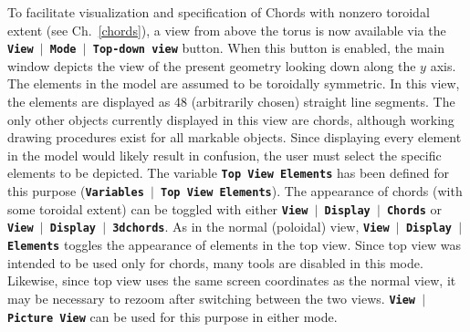 \documentclass[12pt]{report}
\begin{document}
To facilitate visualization and specification of Chords 
with nonzero toroidal extent (see Ch.~\ref{chords}), a view from above the
torus is now available via the
\textbf{\texttt{View  \begin{math}\vert{}\end{math}  Mode  \begin{math}\vert{}\end{math}  Top-down view}}
button.  When this button is enabled, the main window depicts the view of the
present geometry looking down along the $y$ axis.  The elements in the
model are assumed to be toroidally symmetric.  In this view, the elements are
displayed as 48 (arbitrarily chosen) straight line segments.  The only
other objects currently displayed in this view are chords, although
working drawing procedures exist for all markable objects. Since displaying
every element in the model would likely result in confusion, the user
must select the specific elements to be depicted.  The variable
\textbf{\texttt{Top View Elements}} has been defined for this purpose
(\textbf{\texttt{Variables  \begin{math}\vert{}\end{math}  Top View Elements}}).
The appearance of chords (with some toroidal extent) can be toggled with
either \textbf{\texttt{View  \begin{math}\vert{}\end{math}  Display  \begin{math}\vert{}\end{math}  Chords}} 
or \textbf{\texttt{View  \begin{math}\vert{}\end{math}  Display  \begin{math}\vert{}\end{math}  3dchords}}.
As in the normal (poloidal) view, 
\textbf{\texttt{View  \begin{math}\vert{}\end{math}  Display  \begin{math}\vert{}\end{math}  Elements}} toggles the appearance of elements in the top view.
Since top view was intended to be used only for chords, many tools are 
disabled in this mode.  Likewise, since top view uses the same 
screen coordinates as the normal view, it may be necessary to rezoom 
after switching between the two views.  
\textbf{\texttt{View  \begin{math}\vert{}\end{math}  Picture View}}
can be used for this purpose in either mode. 
\end{document}
